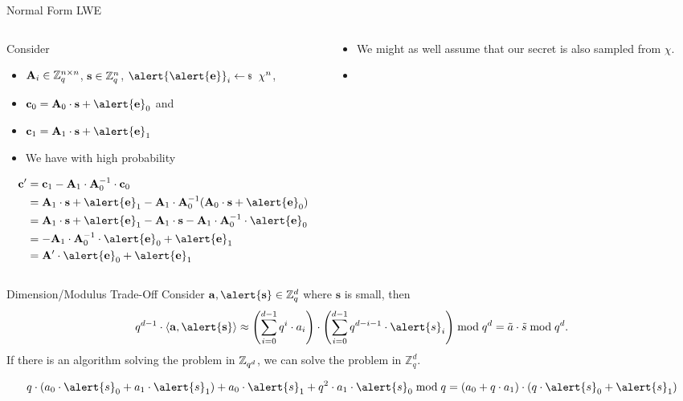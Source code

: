 \documentclass[xcolor=table,10pt,aspectratio=169]{beamer}
\renewcommand{\vec}[1]{\ensuremath{\mathbf{#1}}\xspace}
\providecommand{\mat}[1]{\ensuremath{\vec{#1}}\xspace}
\begin{document}
\begin{frame}[label={sec:org8172370}]{Normal Form LWE}
\begin{columns}[t]
\begin{column}{0.5\columnwidth}
Consider
\begin{itemize}
\item \(\mat{A}_{i} \in \ZZ_q^{n \times n}\), \(\vec{s} \in \ZZ_q^n\), \(\alert{\alert{\vec{e}}}_{i} \sample \chi^n\),
\item \(\vec{c}_0 = \mat{A}_0 \cdot \vec{s} + \alert{\vec{e}}_0\) and
\item \(\vec{c}_1 = \vec{A}_1 \cdot \vec{s} + \alert{\vec{e}}_1\)
\item We have with high probability
\end{itemize}
\begin{align*}
\vec{c}' &= \vec{c}_1 - \mat{A}_1 \cdot \mat{A}_0^{-1} \cdot \vec{c}_0\\
   &= \vec{A}_1\cdot \vec{s} + \alert{\vec{e}}_1 -  \mat{A}_1 \cdot \mat{A}_0^{-1} (\mat{A}_0 \cdot \vec{s} + \alert{\vec{e}}_0)\\
   &= \vec{A}_1\cdot \vec{s} + \alert{\vec{e}}_1 -  \mat{A}_1 \cdot \vec{s} -  \mat{A}_1 \cdot \mat{A}_0^{-1} \cdot \alert{\vec{e}}_0\\
   &= - \mat{A}_1 \cdot \mat{A}_0^{-1} \cdot \alert{\vec{e}}_0 + \alert{\vec{e}}_1\\
   &= \mat{A}' \cdot \alert{\vec{e}}_0 + \alert{\vec{e}}_1
\end{align*}
\end{column}
\begin{column}{0.5\columnwidth}
\begin{itemize}
\item We might as well assume that our secret is also sampled from \(\chi\).

\item {}
\end{itemize}
\end{column}
\end{columns}
\end{frame}
\begin{frame}[label={sec:orga845899}]{Dimension/Modulus Trade-Off}
Consider \(\vec{a}, \alert{\vec{s}} \in \mathbb{Z}_{q}^{d}\) where \(\vec{s}\) is small, then
\[q^{d-1} \cdot \langle{\vec{a},\alert{\vec{s}}}\rangle \approx \left(\sum_{i=0}^{d-1} q^{i} \cdot a_{i}\right) \cdot \left(\sum_{i=0}^{d-1} q^{d-i-1} \cdot \alert{s}_{i}\right) \bmod q^{d} = \tilde{a} \cdot \tilde{s} \bmod q^{d}.\]
If there is an algorithm solving the problem in \(\mathbb{Z}_{q^d}\), we can solve the problem in \(\mathbb{Z}_{q}^d\). 
\begin{example}[\(\ZZ_{q^{2}}\)]\label{sec:orgc522665}
\vspace{-1em}
\[q\cdot \left(a_{0}\cdot \alert{s}_{0} + a_{1} \cdot \alert{s}_{1}\right) + a_{0} \cdot \alert{s}_{1} + q^{2} \cdot a_{1} \cdot \alert{s}_{0} \bmod q = \left(a_{0} + q\cdot a_{1}\right) \cdot (q\cdot \alert{s}_{0} + \alert{s}_{1})\]
\end{example}
\end{frame}
\end{document}
